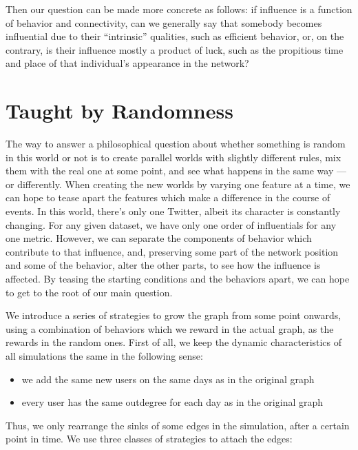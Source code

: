 \documentclass[10pt,oneside]{memoir}
\begin{document}
\begin{Spacing}{2}
Then our question can be made more concrete as follows: if influence is a function of behavior and connectivity, can we generally say that somebody becomes influential due to their ``intrinsic'' qualities, such as efficient behavior, or, on the contrary, is their influence mostly a product of luck, such as the propitious time and place of that individual's appearance in the network?


\section{Taught by Randomness}
\label{taughtbyrandomness}

The way to answer a philosophical question about whether something is random in this world or not is to create parallel worlds with slightly different rules, mix them with the real one at some point, and see what happens in the same way --- or differently.  When creating the new worlds by varying one feature at a time, we can hope to tease apart the features which make a difference in the course of events.  In this world, there's only one Twitter, albeit its character is constantly changing.  For any given dataset, we have only one order of influentials for any one metric.  However, we can separate the components of behavior which contribute to that influence, and, preserving some part of the network position and some of the behavior, alter the other parts, to see how the influence is affected.  By teasing the starting conditions and the behaviors apart, we can hope to get to the root of our main question.


We introduce a series of strategies to grow the graph from some point onwards, using a combination of behaviors which we reward in the actual graph, as the rewards in the random ones.  First of all, we keep the dynamic characteristics of all simulations the same in the following sense:


\begin{itemize}


\item we add the same new users on the same days as in the original graph

\item every user has the same outdegree for each day as in the original graph
\end{itemize}

Thus, we only rearrange the sinks of some edges in the simulation, after a certain point in time.  We use three classes of strategies to attach the edges:



\end{Spacing}
\end{document}
